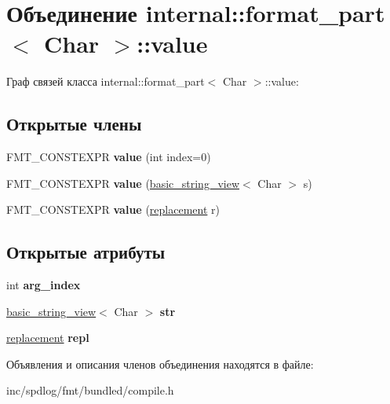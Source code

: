 \hypertarget{unioninternal_1_1format__part_1_1value}{}\section{Объединение internal\+:\+:format\+\_\+part$<$ Char $>$\+:\+:value}
\label{unioninternal_1_1format__part_1_1value}


Граф связей класса internal\+:\+:format\+\_\+part$<$ Char $>$\+:\+:value\+:
\subsection*{Открытые члены}
\begin{DoxyCompactItemize}
\item 
\mbox{\label{unioninternal_1_1format__part_1_1value_a00e9880813ecca85c1632e14feaaaabb}} 
F\+M\+T\+\_\+\+C\+O\+N\+S\+T\+E\+X\+PR {\bfseries value} (int index=0)
\item 
\mbox{\label{unioninternal_1_1format__part_1_1value_a7d3907174fd41b194ca81ba25b35d845}} 
F\+M\+T\+\_\+\+C\+O\+N\+S\+T\+E\+X\+PR {\bfseries value} (\hyperlink{classbasic__string__view}{basic\+\_\+string\+\_\+view}$<$ Char $>$ s)
\item 
\mbox{\label{unioninternal_1_1format__part_1_1value_aa64a9383925a517a2c47666210bddc54}} 
F\+M\+T\+\_\+\+C\+O\+N\+S\+T\+E\+X\+PR {\bfseries value} (\hyperlink{structinternal_1_1format__part_1_1replacement}{replacement} r)
\end{DoxyCompactItemize}
\subsection*{Открытые атрибуты}
\begin{DoxyCompactItemize}
\item 
\mbox{\label{unioninternal_1_1format__part_1_1value_ae92ba41e4292a5833467cce5926c263f}} 
int {\bfseries arg\+\_\+index}
\item 
\mbox{\label{unioninternal_1_1format__part_1_1value_aab731d78cfa7f64fac27d40c9826a56f}} 
\hyperlink{classbasic__string__view}{basic\+\_\+string\+\_\+view}$<$ Char $>$ {\bfseries str}
\item 
\mbox{\label{unioninternal_1_1format__part_1_1value_a21ba8159cce83e254629dd8faebb17f9}} 
\hyperlink{structinternal_1_1format__part_1_1replacement}{replacement} {\bfseries repl}
\end{DoxyCompactItemize}


Объявления и описания членов объединения находятся в файле\+:\begin{DoxyCompactItemize}
\item 
inc/spdlog/fmt/bundled/compile.\+h\end{DoxyCompactItemize}
